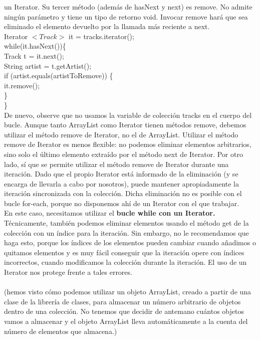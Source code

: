 \documentclass[11pt,a4paper]{article}
\begin{document}
	un Iterator. Su tercer método (además de hasNext y next) es remove. No admite ningún
	parámetro y tiene un tipo de retorno void. Invocar remove hará que sea eliminado el elemento
	devuelto por la llamada más reciente a next.\\
	Iterator $<Track>$ it = tracks.iterator();\\while(it.hasNext())\{\\
	Track t = it.next();\\
	String artist = t.getArtist();\\
	if (artist.equals(artistToRemove)) \{\\
	it.remove();\\
	\}\\
	\}	\\
	De nuevo, observe que no usamos la variable de colección tracks en el cuerpo del bucle. Aunque
	tanto ArrayList como Iterator tienen métodos remove, debemos utilizar el método remove
	de Iterator, no el de ArrayList.
	Utilizar el método remove de Iterator es menos flexible: no podemos eliminar elementos arbitrarios,
	sino solo el último elemento extraído por el método next de Iterator. Por otro lado, sí
	que se permite utilizar el método remove de Iterator durante una iteración. Dado que el propio
	Iterator está informado de la eliminación (y se encarga de llevarla a cabo por nosotros), puede
	mantener apropiadamente la iteración sincronizada con la colección.
	Dicha eliminación no es posible con el bucle for-each, porque no disponemos ahí de un Iterator
	con el que trabajar.\\ En este caso, necesitamos utilizar el\textbf{ bucle while con un Iterator.}
	\\
	Técnicamente, también podemos eliminar elementos usando el método get de la colección con un
	índice para la iteración. Sin embargo, no le recomendamos que haga esto, porque los índices de los
	elementos pueden cambiar cuando añadimos o quitamos elementos y es muy fácil conseguir que
	la iteración opere con índices incorrectos, cuando modificamos la colección durante la iteración.
	El uso de un Iterator nos protege frente a tales errores.\\
	\\
	(hemos visto cómo podemos utilizar un objeto ArrayList, creado a
	partir de una clase de la librería de clases, para almacenar un número arbitrario de objetos dentro
	de una colección. No tenemos que decidir de antemano cuántos objetos vamos a almacenar y el
	objeto ArrayList lleva automáticamente a la cuenta del número de elementos que almacena.)\\
\end{document}
